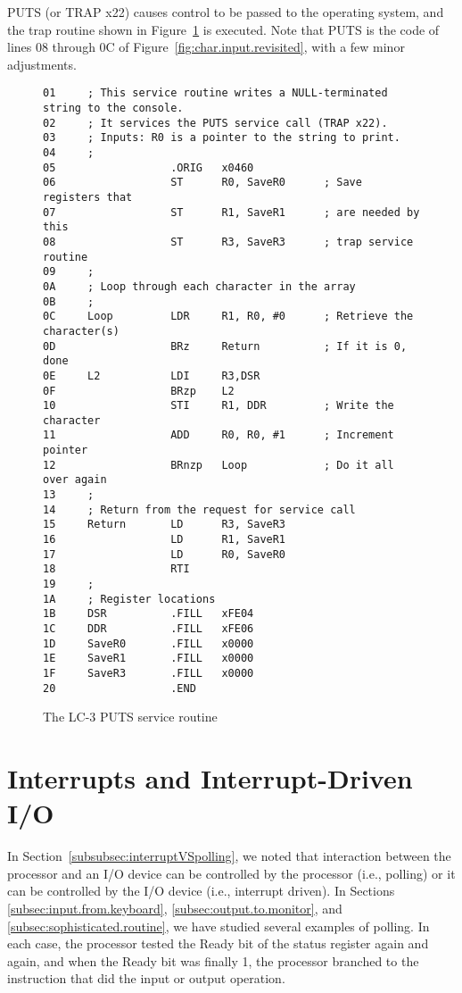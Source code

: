 \documentclass{patt}
\begin{document}
PUTS (or TRAP x22) causes control to be passed to the operating
system, and the trap routine shown in Figure~\ref{fig:puts.routine} is
executed.  Note that PUTS is the code of lines 08 through 0C of
Figure~\ref{fig:char.input.revisited}, with a few minor adjustments.

\begin{figure}[h!]
\begin{minipage}{36pc}
\begin{Verbatim}[fontsize=\fontsize{9}{10}\selectfont]
01     ; This service routine writes a NULL-terminated string to the console.
02     ; It services the PUTS service call (TRAP x22).
03     ; Inputs: R0 is a pointer to the string to print.
04     ;
05                  .ORIG   x0460           
06                  ST      R0, SaveR0      ; Save registers that 
07                  ST      R1, SaveR1      ; are needed by this
08                  ST      R3, SaveR3      ; trap service routine
09     ;
0A     ; Loop through each character in the array
0B     ;
0C     Loop         LDR     R1, R0, #0      ; Retrieve the character(s)
0D                  BRz     Return          ; If it is 0, done
0E     L2           LDI     R3,DSR
0F                  BRzp    L2
10                  STI     R1, DDR         ; Write the character
11                  ADD     R0, R0, #1      ; Increment pointer
12                  BRnzp   Loop            ; Do it all over again
13     ;
14     ; Return from the request for service call
15     Return       LD      R3, SaveR3
16                  LD      R1, SaveR1
17                  LD      R0, SaveR0
18                  RTI
19     ;
1A     ; Register locations
1B     DSR          .FILL   xFE04
1C     DDR          .FILL   xFE06
1D     SaveR0       .FILL   x0000
1E     SaveR1       .FILL   x0000
1F     SaveR3       .FILL   x0000
20                  .END
\end{Verbatim}
\caption{The LC-3 PUTS service routine}
\label{fig:puts.routine}
\end{minipage}
\end{figure}

\FloatBarrier 
\section{Interrupts and Interrupt-Driven I/O}
\label{sec:interruptsIO}

In Section~\ref{subsubsec:interruptVSpolling}, we noted that
interaction between the processor and an I/O device can be controlled
by the processor (i.e., polling) or it can be controlled by the I/O
device (i.e., interrupt driven). In Sections
\ref{subsec:input.from.keyboard}, \ref{subsec:output.to.monitor}, and
\ref{subsec:sophisticated.routine}, we have studied several examples
of polling. In each case, the processor tested the Ready bit of the
status register again and again, and when the Ready bit was finally 1, the
processor branched to the instruction that did the input or output
operation.
\end{document}
